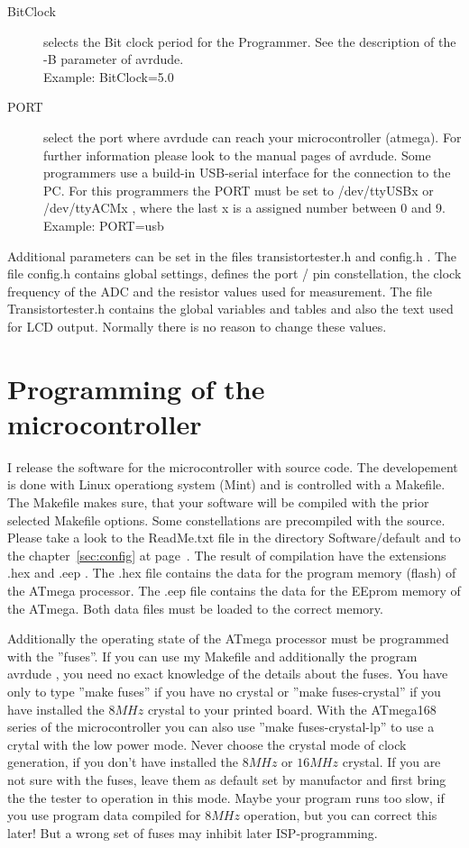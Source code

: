 \begin{description}
  \item[BitClock] selects the Bit clock period for the Programmer. See the description of the -B parameter of avrdude.\\
Example: BitClock=5.0

  \item[PORT] select the port where avrdude can reach your microcontroller (atmega).
For further information please look to the manual pages of avrdude.
Some programmers use a build-in USB-serial interface for the connection to the PC.
For this programmers the PORT must be set to /dev/ttyUSBx or /dev/ttyACMx , where
the last x is a assigned number between 0 and 9.\\
Example: PORT=usb

\end{description}

Additional parameters can be set in the files transistortester.h and config.h .
The file config.h contains global settings, defines the port / pin constellation,
 the clock frequency of the ADC and the resistor values used for measurement.
The file Transistortester.h contains the global variables and tables and also the text used for LCD output.
Normally there is no reason to change these values.



\section{Programming of the microcontroller}
I release the software for the microcontroller with source code.
The developement is done with Linux operationg system (Mint) and
is controlled with a Makefile. The Makefile makes sure, that your
software will be compiled with the prior selected Makefile options. Some constellations
are precompiled with the source. Please take a look to the ReadMe.txt file
in the directory Software/default and to the chapter~\ref{sec:config} at page~\pageref{sec:config}.
The result of compilation have the extensions .hex and .eep .
The .hex file contains the data for the program memory (flash) of the ATmega processor.
The .eep file contains the data for the EEprom memory of the ATmega. Both data files
must be loaded to the correct memory.

Additionally the operating state of the
ATmega processor must be programmed with the ''fuses''.
If you can use my Makefile and additionally the program avrdude \cite{avrdude}, you need no exact
knowledge of the details about the fuses. You have only to type ''make fuses'' if you
have no crystal or ''make fuses-crystal'' if you have installed the \(8MHz\) crystal to your printed board.
With the ATmega168 series of the microcontroller you can also use ''make fuses-crystal-lp'' to use
a crytal with the low power mode.
Never choose the crystal mode of clock generation, if you don't have installed
the \(8MHz\) or \(16MHz\) crystal. If you are not sure with the fuses, leave them as default
set by manufactor and first bring the the tester to operation in this mode.
Maybe your program runs too slow, if you use program data compiled for
\(8MHz\) operation, but you can correct this later! But a wrong set of fuses may inhibit
later ISP-programming.

